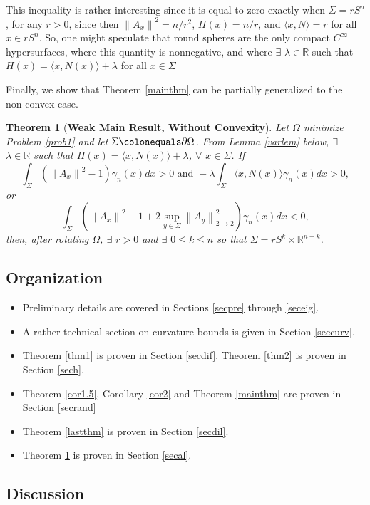 \documentclass[12pt,reqno]{amsart}
\newtheorem{theorem}{Theorem}[section]
\theoremstyle{definition}
\newcommand{\vnormt}[1]{\left\|#1\right\|}    %
\newcommand{\R}{\mathbb{R}}
\newcommand{\embolden}[1]{\textbf {#1}}
\newcommand{\sdimn}{n}
\newcommand{\scon}{\lambda}
\begin{document}
This inequality is rather interesting since it is equal to zero exactly when $\Sigma=r S^{\sdimn}$, for any $r>0$, since then $\vnormt{A_{x}}^{2}=\sdimn/r^{2}$, $H(x)=\sdimn/r$, and $\langle x,N\rangle=r$ for all $x\in rS^{\sdimn}$.  So, one might speculate that round spheres are the only compact $C^{\infty}$ hypersurfaces, where this quantity is nonnegative, and where $\exists$ $\scon\in\R$ such that $H(x)=\langle x,N(x)\rangle+\scon$ for all $x\in\Sigma$

Finally, we show that Theorem \ref{mainthm} can be partially generalized to the non-convex case.

\begin{theorem}[\embolden{Weak Main Result, Without Convexity}]\label{mainthm2}
Let $\Omega$ minimize Problem \ref{prob1} and let $\Sigma\colonequals\partial\Omega$.  From Lemma \ref{varlem} below, $\exists$ $\scon\in\R$ such that $H(x)=\langle x,N(x)\rangle+\scon$, $\forall$ $x\in\Sigma$.  If
$$\int_{\Sigma}(\vnormt{A_{x}}^{2}-1)\gamma_{\sdimn}(x)dx>0\,\,\mbox{and}\,\,-\scon\int_{\Sigma}\langle x,N(x)\rangle\gamma_{\sdimn}(x)dx>0,$$
or
$$\int_{\Sigma}(\vnormt{A_{x}}^{2}-1+2\sup_{y\in\Sigma}\vnormt{A_{y}}_{2\to 2}^{2})\gamma_{\sdimn}(x)dx<0,$$
then, after rotating $\Omega$, $\exists$ $r>0$ and $\exists$ $0\leq k\leq \sdimn$ so that $\Sigma=r S^{k}\times\R^{\sdimn-k}$.
\end{theorem}


\subsection{Organization}

\begin{itemize}
\item Preliminary details are covered in Sections \ref{secpre} through \ref{seceig}.
\item  A rather technical section on curvature bounds is given in Section \ref{seccurv}.
\item Theorem \ref{thm1} is proven in Section \ref{secdif}.  Theorem \ref{thm2} is proven in Section \ref{sech}.
\item Theorem \ref{cor1.5}, Corollary \ref{cor2} and Theorem \ref{mainthm} are proven in Section \ref{secrand}
\item Theorem \ref{lastthm} is proven in Section \ref{secdil}.
\item Theorem \ref{mainthm2} is proven in Section \ref{secal}.
\end{itemize}

\subsection{Discussion}
\end{document}
